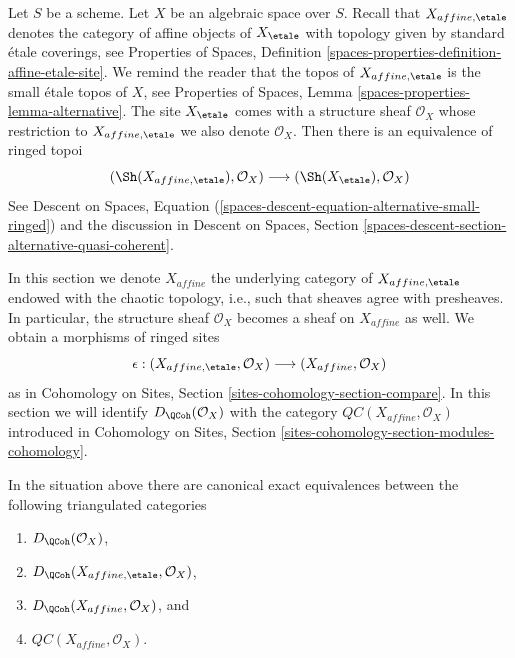 \noindent
Let $S$ be a scheme. Let $X$ be an algebraic space over $S$.
Recall that $X_{affine, \etale}$ denotes the category of affine
objects of $X_\etale$ with topology given by standard \'etale coverings, see
Properties of Spaces, Definition
\ref{spaces-properties-definition-affine-etale-site}.
We remind the reader that the topos of $X_{affine, \etale}$
is the small \'etale topos of $X$, see Properties of Spaces, Lemma
\ref{spaces-properties-lemma-alternative}. The site $X_\etale$
comes with a structure sheaf $\mathcal{O}_X$ whose restriction
to $X_{affine, \etale}$ we also denote $\mathcal{O}_X$. Then there is an
equivalence of ringed topoi
$$
(\Sh(X_{affine, \etale}), \mathcal{O}_X)
\longrightarrow
(\Sh(X_\etale), \mathcal{O}_X)
$$
See Descent on Spaces, Equation
(\ref{spaces-descent-equation-alternative-small-ringed})
and the discussion in
Descent on Spaces, Section
\ref{spaces-descent-section-alternative-quasi-coherent}.

\medskip\noindent
In this section we denote $X_{affine}$ the underlying category of
$X_{affine, \etale}$ endowed with the chaotic topology, i.e., such that sheaves
agree with presheaves. In particular, the structure sheaf $\mathcal{O}_X$
becomes a sheaf on $X_{affine}$ as well.
We obtain a morphisms of ringed sites
$$
\epsilon :
(X_{affine, \etale}, \mathcal{O}_X)
\longrightarrow
(X_{affine}, \mathcal{O}_X)
$$
as in Cohomology on Sites, Section \ref{sites-cohomology-section-compare}.
In this section we will identify $D_\QCoh(\mathcal{O}_X)$ with
the category $\mathit{QC}(X_{affine}, \mathcal{O}_X)$ introduced in
Cohomology on Sites, Section \ref{sites-cohomology-section-modules-cohomology}.

\begin{lemma}
\label{lemma-DQCoh-alternative-small}
In the situation above there are canonical exact equivalences between
the following triangulated categories
\begin{enumerate}
\item $D_\QCoh(\mathcal{O}_X)$,
\item $D_\QCoh(X_{affine, \etale}, \mathcal{O}_X)$,
\item $D_\QCoh(X_{affine}, \mathcal{O}_X)$, and
\item $\mathit{QC}(X_{affine}, \mathcal{O}_X)$.
\end{enumerate}
\end{lemma}

